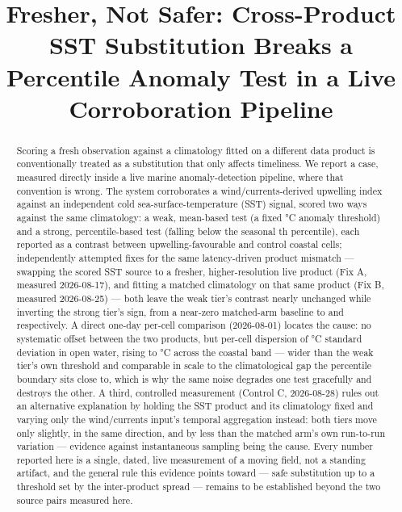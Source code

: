 \documentclass[conference]{IEEEtran}
\begin{document}
\title{Fresher, Not Safer: Cross-Product SST Substitution Breaks a Percentile
Anomaly Test in a Live Corroboration Pipeline}

\author{
}

\maketitle

\begin{abstract}
Scoring a fresh observation against a climatology fitted on a different data
product is conventionally treated as a substitution that only affects
timeliness. We report a case, measured directly inside a live marine
anomaly-detection pipeline, where that convention is wrong. The system
corroborates a wind/currents-derived upwelling index against an independent
cold sea-surface-temperature (SST) signal, scored two ways against the same
climatology: a weak, mean-based test (a fixed \CoolAnomalyThreshold{}\si{\celsius}
anomaly threshold) and a strong, percentile-based test (falling below the
seasonal \ClimPercentile{}th percentile), each reported as a contrast between
upwelling-favourable and control coastal cells; \NCrossProductFixes{}
independently attempted fixes for the same latency-driven product mismatch
--- swapping the scored SST source to a fresher, higher-resolution live
product (Fix A, measured 2026-08-17), and fitting a matched climatology on
that same product (Fix B, measured 2026-08-25) --- both leave the weak
tier's contrast nearly unchanged while inverting the strong tier's sign, from
a near-zero matched-arm baseline to \FixAStrongLive{} and \FixBStrongGlorys{}
respectively. A direct one-day per-cell comparison (2026-08-01) locates the
cause: no systematic offset between the two products, but per-cell dispersion
of \DisagOpenSD{}\si{\celsius} standard deviation in open water, rising to
\DisagCoastalSD{}\si{\celsius} across the coastal band --- wider than the weak
tier's own threshold and comparable in scale to the climatological gap the
percentile boundary sits close to, which is why the same noise degrades one
test gracefully and destroys the other. A third, controlled measurement
(Control C, 2026-08-28) rules out an alternative explanation by holding the
SST product and its climatology fixed and varying only the wind/currents
input's temporal aggregation instead: both tiers move only slightly, in the
same direction, and by less than the matched arm's own run-to-run variation
--- evidence against instantaneous sampling being the cause. Every number
reported here is a single, dated, live measurement of a moving field, not a
standing artifact, and the general rule this evidence points toward --- safe
substitution up to a threshold set by the inter-product spread --- remains to
be established beyond the two source pairs measured here.
\end{abstract}
\end{document}
